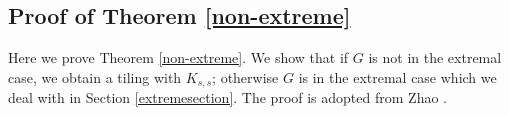 \documentclass[oneside,12pt]{memoir}
\newtheorem{lemma}[theorem]{Lemma}
\newcommand{\ep}{\epsilon}
\begin{document}
% 
% 
% 
% 


\subsection{Proof of Theorem \ref{non-extreme}}

Here we prove Theorem \ref{non-extreme}.  We show that if $G$ is not in the extremal case, we obtain a tiling with $K_{s,s}$; otherwise $G$ is in the extremal case which we deal with in Section \ref{extremesection}.  The proof is adopted from Zhao \cite{Z}.
\end{document}
